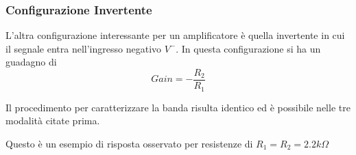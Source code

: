 \subsubsection{Configurazione Invertente}

L'altra configurazione interessante per un amplificatore è quella invertente in cui il segnale entra nell'ingresso negativo $V^-$.
 In questa configurazione si ha un guadagno di $$Gain = -\frac{R_2}{R_1}$$

 Il procedimento per caratterizzare la banda risulta identico ed è possibile nelle tre modalità citate prima.

 Questo è un esempio di risposta osservato per resistenze di $R_1 = R_2 = 2.2k\Omega$

\begin{minipage}{0.8\textwidth}


\end{minipage}
